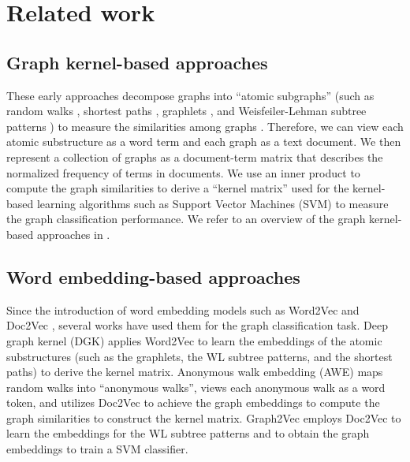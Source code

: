 \documentclass[twoside,leqno,twocolumn]{article}
\newcommand{\citep}{\cite}
\begin{document}
\section{Related work}
\label{sec:relatedwork}

\subsection{Graph kernel-based approaches} 
These early approaches decompose graphs into ``atomic subgraphs'' (such as random walks \citep{gartner2003graph,kashima2003marginalized,vishwanathan2010graph}, shortest paths \citep{Borgwardt2005}, graphlets \citep{shervashidze2009efficient}, and Weisfeiler-Lehman subtree patterns \citep{shervashidze2011weisfeiler}) to measure the similarities among graphs \citep{gartner2003graph}. 
Therefore, we can view each atomic substructure as a word term and each graph as a text document.
We then represent a collection of graphs as a document-term matrix that describes the normalized frequency of terms in documents.
We use an inner product to compute the graph similarities to derive a ``kernel matrix'' used for the kernel-based learning algorithms such as Support Vector Machines (SVM) \citep{hofmann2008kernel} to measure the graph classification performance.
We refer to an overview of the graph kernel-based approaches in \citep{nikolentzos2019graph,kriege2019survey}.

\subsection{Word embedding-based approaches} 
Since the introduction of word embedding models such as Word2Vec \citep{MikolovSCCD13nips} and Doc2Vec \citep{le:2014}, several works have used them for the graph classification task.
Deep graph kernel (DGK) \citep{yanardag2015deep} applies Word2Vec to learn the embeddings of the atomic substructures (such as the graphlets, the WL subtree patterns, and the shortest paths) to derive the kernel matrix.
Anonymous walk embedding (AWE) \citep{ivanov2018anonymous} maps random walks into ``anonymous walks'', views each anonymous walk as a word token, and utilizes Doc2Vec to achieve the graph embeddings to compute the graph similarities to construct the kernel matrix.
Graph2Vec \citep{narayanan2017graph2vec} employs Doc2Vec to learn the embeddings for the WL subtree patterns and to obtain the graph embeddings to train a SVM classifier.
\end{document}
